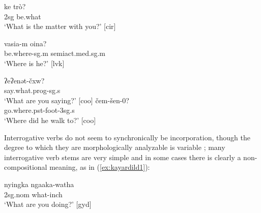 \documentclass [11pt, proquest] {uwthesis}[2016/11/22]
\begin{document}
 \begin{exe}
 \ex \gll ke tr\`{o}?\\
 {\sc 2sg} be.what\\
 `What is the matter with you?' [cir] \cite[p. 5]{hagege2008towards}
 \label{ex:tiri1}
 \end{exe}

 \begin{exe}
 \ex \gll vasia-m oina?\\
 be.where-{\sc sg.m} {\sc semiact.med.sg.m}\\
 `Where is he?' [lvk] \cite[p. 5]{hagege2008towards}
 \label{ex:lavukaleve1}
 \end{exe}

 \begin{exe}
 \ex \gll ʔeʔenət-\v{c}xw?\\
 say.what.{\sc prog-sg.s}\\
 `What are you saying?' [coo] \cite[p. 5]{hagege2008towards}
 \ex \gll \v{c}em-\v{s}en-0?\\
 go.where.{\sc pst}-foot-{\sc 3sg.s}\\
 `Where did he walk to?' [coo] \cite[p. 5]{hagege2008towards}
 \label{ex:comox1}
 \end{exe}
 
Interrogative verbs do not seem to synchronically be incorporation, though the degree to which they are morphologically analyzable is variable \citep{hagege2008towards}; many interrogative verb stems are very simple and in some cases there is clearly a non-compositional meaning, as in  (\ref{ex:kayardild1}):



\begin{exe}
 \ex \gll nyingka ngaaka-watha\\
 {\sc 2sg.nom} what-{\sc inch}\\
 `What are you doing?' [gyd] \cite[p. 6]{hagege2008towards}
 \label{ex:kayardild1}
 \end{exe}
\end{document}
